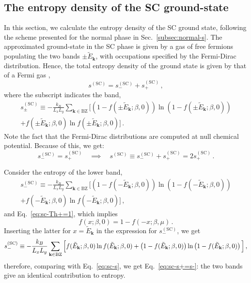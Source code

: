 \subsection{The entropy density of the SC ground-state}\label{subsec:sc-s}

In this section, we calculate the entropy density of the SC ground state, following the scheme presented for the normal phase in Sec.~\ref{subsec:normal-s}. The approximated ground-state in the SC phase is given by a gas of free fermions populating the two bands $\pm \tilde{E}_\mathbf{k}$, with occupations specified by the Fermi-Dirac distribution. Hence, the total entropy density of the ground state is given by that of a Fermi gas \cite{grosso2014solid},
\[
s^{(\mathrm{SC})} = s_-^{(\mathrm{SC})} + s_+^{(\mathrm{SC})} \, ,
\]
where the subscript indicates the band,
\begin{multline}
	s_\pm^{(\mathrm{SC})} \equiv -\frac{k_B}{L_x L_y} \sum_{\mathbf{k}\in\mathrm{BZ}} \Big[
	\left(
	1- f( \pm\tilde{E}_\mathbf{k}; \beta,0)
	\right) \ln \left(
	1- f( \pm\tilde{E}_\mathbf{k}; \beta,0)
	\right) \\
	+ f(
	\pm\tilde{E}_\mathbf{k}; \beta,0)
	\ln f( \pm\tilde{E}_\mathbf{k}; \beta,0)
	\Big] \, . \label{eq:sc-s}
\end{multline}
Note the fact that the Fermi-Dirac distributions are computed at null chemical potential. Because of this, we get:
\begin{equation}\label{eq:sc-s+=s-}
	s^{(\mathrm{SC})}_- = s_+^{(\mathrm{SC})}
	\quad\implies\quad
	s^{(\mathrm{SC})} \equiv s_-^{(\mathrm{SC})} + s_+^{(\mathrm{SC})} = 2 s_+^{(\mathrm{SC})} \, .
\end{equation}

\begin{tabproof}[Proof of Eq.~\eqref{eq:sc-s+=s-}: Bogoliubov bands $\pm \tilde{E}_\mathbf{k}$ give equal entropy densities]
	
	Consider the entropy of the lower band,
	\begin{multline*}
		s_-^{(\mathrm{SC})} \equiv -\frac{k_B}{L_x L_y} \sum_{\mathbf{k}\in\mathrm{BZ}} \Big[
		\left(
		1- f( -\tilde{E}_\mathbf{k}; \beta,0)
		\right) \ln \left(
		1- f( -\tilde{E}_\mathbf{k}; \beta,0)
		\right) \\
		+ f(
		-\tilde{E}_\mathbf{k}; \beta,0)
		\ln f( -\tilde{E}_\mathbf{k}; \beta,0)
		\Big] \, ,
	\end{multline*}
	and Eq.~\eqref{eq:sc-Th+=1}, which implies
	\[
	f(x;\beta,0) = 1-f(-x;\beta,\mu) \, .
	\]
	Inserting the latter for $x=\tilde{E}_\mathbf{k}$ in the expression for $s_-^{(\mathrm{SC})}$, we get
	\[
	s_-^{(\mathrm{SC})} \equiv -\frac{k_B}{L_x L_y} \sum_{\mathbf{k}\in\mathrm{BZ}} \Big[
	f(
	\tilde{E}_\mathbf{k}; \beta,0)
	\ln f( \tilde{E}_\mathbf{k}; \beta,0) \\
	+ \left(
	1- f( \tilde{E}_\mathbf{k}; \beta,0)
	\right) \ln \left(
	1- f( \tilde{E}_\mathbf{k}; \beta,0)
	\right)
	\Big] \, ,
	\]
	therefore, comparing with Eq.~\eqref{eq:sc-s}, we get Eq.~\eqref{eq:sc-s+=s-}: the two bands give an identical contribution to entropy.
\end{tabproof}

